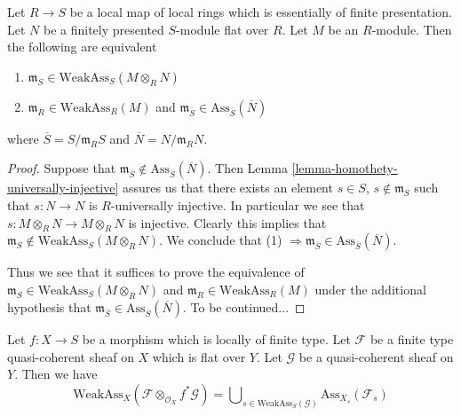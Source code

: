 \begin{lemma}
\label{lemma-weak-bourbaki}
Let $R \to S$ be a local map of local rings which is essentially of
finite presentation. Let $N$ be a finitely presented $S$-module flat over $R$.
Let $M$ be an $R$-module. Then the following are equivalent
\begin{enumerate}
\item $\mathfrak m_S \in \text{WeakAss}_S(M \otimes_R N)$
\item $\mathfrak m_R \in \text{WeakAss}_R(M)$ and
$\mathfrak m_{\overline{S}} \in
\text{Ass}_{\overline{S}}(\overline{N})$
\end{enumerate}
where $\overline{S} = S/\mathfrak m_R S$ and
$\overline{N} = N/\mathfrak m_R N$.
\end{lemma}

\begin{proof}
Suppose that
$\mathfrak m_{\overline{S}} \not \in \text{Ass}_{\overline{S}}(\overline{N})$.
Then
Lemma \ref{lemma-homothety-universally-injective}
assures us that there exists an element $s \in S$, $s \not \in \mathfrak m_S$
such that $s : N \to N$ is $R$-universally injective. In particular
we see that $s : M \otimes_R N \to M \otimes_R N$ is injective.
Clearly this implies that
$\mathfrak m_S \not \in \text{WeakAss}_S(M \otimes_R N)$.
We conclude that (1)
$\Rightarrow \mathfrak m_{\overline{S}} \in
\text{Ass}_{\overline{S}}(\overline{N})$.

\medskip\noindent
Thus we see that it suffices to prove the equivalence of
$\mathfrak m_S \in \text{WeakAss}_S(M \otimes_R N)$ and
$\mathfrak m_R \in \text{WeakAss}_R(M)$ under the additional
hypothesis that
$\mathfrak m_{\overline{S}} \in \text{Ass}_{\overline{S}}(\overline{N})$.
To be continued...
\end{proof}

\begin{lemma}
\label{lemma-bourbaki-finite-type-general-base}
Let $f : X \to S$ be a morphism which is locally of finite type.
Let $\mathcal{F}$ be a finite type quasi-coherent sheaf on $X$
which is flat over $Y$. Let $\mathcal{G}$ be a quasi-coherent sheaf on $Y$.
Then we have
$$
\text{WeakAss}_X(\mathcal{F} \otimes_{\mathcal{O}_X} f^*\mathcal{G}) =
\bigcup\nolimits_{s \in \text{WeakAss}_S(\mathcal{G})}
\text{Ass}_{X_s}(\mathcal{F}_s)
$$
\end{lemma}

